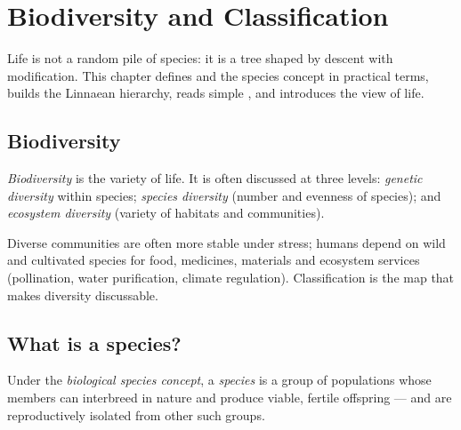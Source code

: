 \chapter{Biodiversity and Classification}\label{ch:g10:biodiversity-classification}

Life is not a random pile of species: it is a  tree shaped by
descent with modification. This chapter defines  and the
species concept in practical terms, builds the Linnaean hierarchy, reads
simple , and introduces the  view of life.

\section{Biodiversity}

\begin{definition}[Biodiversity]\label{def:g10:biodiversity-classification:biodiversity}
\emph{Biodiversity} is the variety of life. It is
often discussed at three levels: \emph{genetic diversity} within species; \emph{species diversity} (number and evenness of species); and \emph{ecosystem
diversity} (variety of habitats and
communities).
\end{definition}

\begin{remark}\label{rem:g10:biodiversity-classification:why}
Diverse communities are often more stable under stress; humans depend on
wild and cultivated species for food, medicines, materials and ecosystem
services (pollination, water purification, climate regulation).
Classification is the map that makes diversity discussable.
\end{remark}

\section{What is a species?}

\begin{definition}\label{def:g10:biodiversity-classification:species}
Under the \emph{biological species concept}, a \emph{species} is a group of populations
whose members can interbreed in nature and produce viable, fertile
offspring --- and are reproductively isolated from other such groups.
\end{definition}

